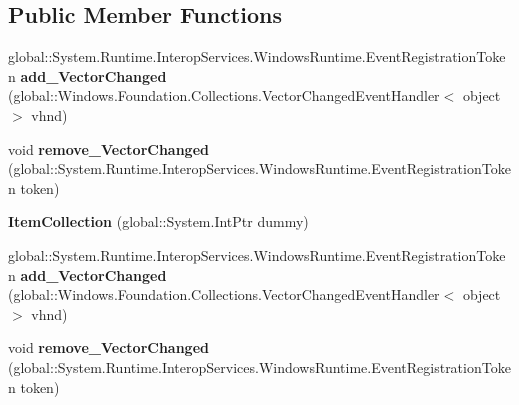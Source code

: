 \subsection*{Public Member Functions}
\begin{DoxyCompactItemize}
\item 
\mbox{\label{class_windows_1_1_u_i_1_1_xaml_1_1_controls_1_1_item_collection_a920f67d58690f01bbcb0c548e064083c}} 
global\+::\+System.\+Runtime.\+Interop\+Services.\+Windows\+Runtime.\+Event\+Registration\+Token {\bfseries add\+\_\+\+Vector\+Changed} (global\+::\+Windows.\+Foundation.\+Collections.\+Vector\+Changed\+Event\+Handler$<$ object $>$ vhnd)
\item 
\mbox{\label{class_windows_1_1_u_i_1_1_xaml_1_1_controls_1_1_item_collection_afdfa282fb26aff5d9800af371b2a81a6}} 
void {\bfseries remove\+\_\+\+Vector\+Changed} (global\+::\+System.\+Runtime.\+Interop\+Services.\+Windows\+Runtime.\+Event\+Registration\+Token token)
\item 
\mbox{\label{class_windows_1_1_u_i_1_1_xaml_1_1_controls_1_1_item_collection_a42920e204a2cf93fedbd9741da1bd6e6}} 
{\bfseries Item\+Collection} (global\+::\+System.\+Int\+Ptr dummy)
\item 
\mbox{\label{class_windows_1_1_u_i_1_1_xaml_1_1_controls_1_1_item_collection_a920f67d58690f01bbcb0c548e064083c}} 
global\+::\+System.\+Runtime.\+Interop\+Services.\+Windows\+Runtime.\+Event\+Registration\+Token {\bfseries add\+\_\+\+Vector\+Changed} (global\+::\+Windows.\+Foundation.\+Collections.\+Vector\+Changed\+Event\+Handler$<$ object $>$ vhnd)
\item 
\mbox{\label{class_windows_1_1_u_i_1_1_xaml_1_1_controls_1_1_item_collection_afdfa282fb26aff5d9800af371b2a81a6}} 
void {\bfseries remove\+\_\+\+Vector\+Changed} (global\+::\+System.\+Runtime.\+Interop\+Services.\+Windows\+Runtime.\+Event\+Registration\+Token token)
\item 
\mbox{\label{class_windows_1_1_u_i_1_1_xaml_1_1_controls_1_1_item_collection_a42920e204a2cf93fedbd9741da1bd6e6}} 

\end{DoxyCompactItemize}
